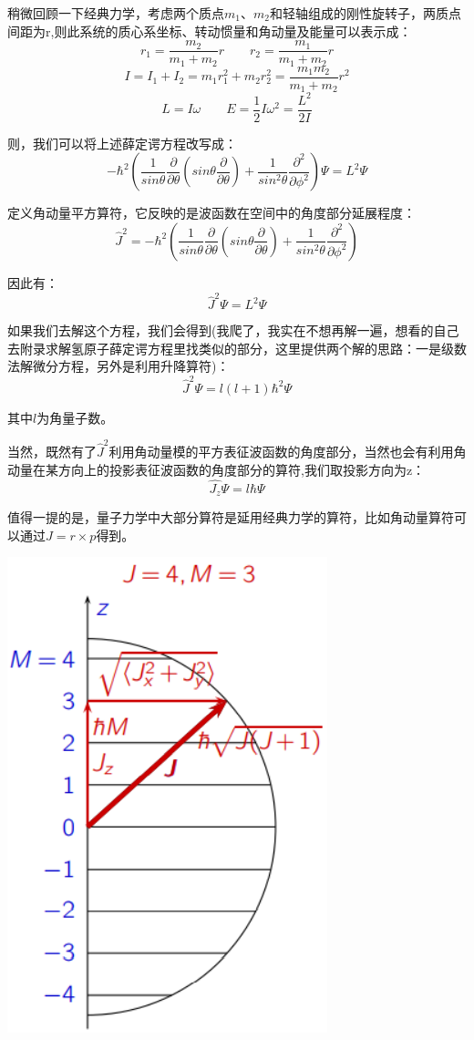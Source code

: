 稍微回顾一下经典力学，考虑两个质点$m_1$、$m_2$和轻轴组成的刚性旋转子，两质点间距为r,则此系统的质心系坐标、转动惯量和角动量及能量可以表示成：
\[r_1=\frac{m_2}{m_1+m_2}r \qquad r_2=\frac{m_1}{m_1+m_2}r\]
\[I=I_1+I_2=m_1r_1^2+m_2r_2^2=\frac{m_1m_2}{m_1+m_2}r^2\]
\[L=I\omega \qquad E=\frac{1}{2}I\omega^2=\frac{L^2}{2I}\]

则，我们可以将上述薛定谔方程改写成：
\[-\hbar^2\left (\frac{1}{sin\theta}\frac{\partial}{\partial{\theta}}(sin\theta\frac{\partial}{\partial{\theta}})+\frac{1}{sin^2 \theta }\frac{\partial^2}{\partial{\phi^2}} \right )\varPsi=L^2\varPsi\]

定义角动量平方算符，它反映的是波函数在空间中的角度部分延展程度：
\[\hat{J}^2=-\hbar^2\left (\frac{1}{sin\theta}\frac{\partial}{\partial{\theta}}(sin\theta\frac{\partial}{\partial{\theta}})+\frac{1}{sin^2 \theta }\frac{\partial^2}{\partial{\phi^2}} \right )\]

因此有：
\[\hat{J}^2\varPsi=L^2\varPsi\]

如果我们去解这个方程，我们会得到(我爬了，我实在不想再解一遍，想看的自己去附录求解氢原子薛定谔方程里找类似的部分，这里提供两个解的思路：一是级数法解微分方程，另外是利用升降算符)：
\[\hat{J}^2\varPsi=l(l+1)\hbar^2\varPsi\]

其中$l$为角量子数。

当然，既然有了$\hat{J}^2$利用角动量模的平方表征波函数的角度部分，当然也会有利用角动量在某方向上的投影表征波函数的角度部分的算符,我们取投影方向为z：
\[\hat{J_z}\varPsi=l\hbar\varPsi\]

值得一提的是，量子力学中大部分算符是延用经典力学的算符，比如角动量算符可以通过$J=r \times p$得到。
 
\begin{center}
    \includegraphics[scale=0.5]{fig/lzhx/微信图片_20211026130340.png}
\end{center}


